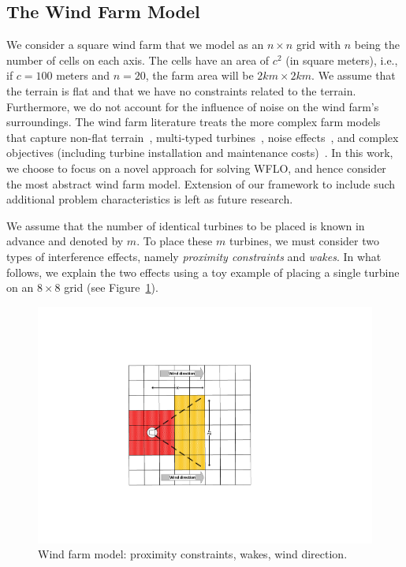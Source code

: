 \documentclass[preprint,12pt]{elsarticle}
\begin{document}
\subsection{The Wind Farm Model}

We consider a square wind farm that we model as an $n\times n$
grid with $n$ being the number of cells on each axis.  The cells have
an area of $c^2$ (in square meters), i.e., if $c=100$ meters and
$n=20$, the farm area will be $2km\times 2km$.  We
assume that the terrain is flat and that we have no constraints
related to the terrain.  Furthermore, we do not account for the
influence of noise on the wind farm's surroundings. The wind farm
literature treats the more complex farm models that capture non-flat
terrain~\cite{song2015lazy,kuo2016wind}, multi-typed
turbines~\cite{feng2017design}, noise
effects~\cite{Zhang2014,sorkhabi2016impact,yin2014multi}, and complex
objectives (including turbine installation and maintenance
costs)~\cite{lackner2007analytical,sorkhabi2018constrained}.  In this work, we 
choose to focus on a
novel approach for solving WFLO, and hence consider the most
abstract wind farm model. Extension of our framework to include such additional problem characteristics is left as future research.
 
We assume that the number of identical turbines to be placed is known 
in advance and denoted by $m$. To place these $m$ turbines, 
we must consider two types of interference effects, namely \emph{proximity constraints} and \emph{wakes}.
In what follows, we explain the two effects using a toy example of placing a single turbine on an 
$8\times8$ grid (see Figure~\ref{fig:field_model}).

\begin{figure}[t]
	\centering
	\includegraphics[scale = 0.9]{field_model.pdf}

	\caption{Wind farm model: proximity constraints, wakes, wind direction.}\label{fig:field_model}
\end{figure}
\end{document}
